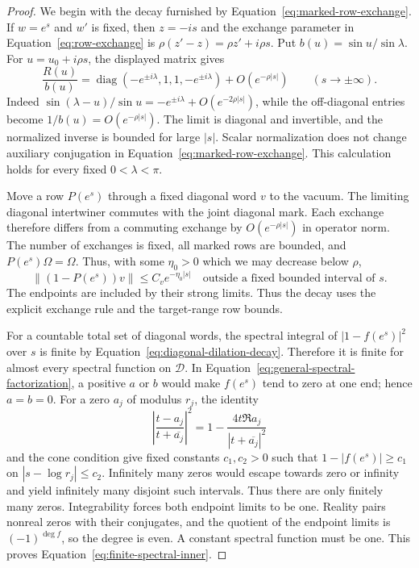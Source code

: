 \begin{proof}
We begin with the decay furnished by
Equation~\eqref{eq:marked-row-exchange}.  If $w=e^s$ and $w'$ is
fixed, then $z=-is$ and the exchange parameter in
Equation~\eqref{eq:row-exchange} is
$\rho(z'-z)=\rho z'+i\rho s$.  Put
$b(u)=\sin u/\sin\lambda$.  For $u=u_0+i\rho s$, the displayed
matrix gives
\begin{equation}\label{eq:normalized-intertwiner-limit}
 \frac{R(u)}{b(u)}
 =\operatorname{diag}(-e^{\pm i\lambda},1,1,-e^{\pm i\lambda})
       +O(e^{-\rho|s|})
 \qquad(s\longrightarrow\pm\infty).
\end{equation}
Indeed $\sin(\lambda-u)/\sin u=-e^{\pm i\lambda}
+O(e^{-2\rho|s|})$, while the off-diagonal entries become
$1/b(u)=O(e^{-\rho|s|})$.  The limit is diagonal and invertible,
and the normalized inverse is bounded for large $|s|$.  Scalar
normalization does not change auxiliary conjugation in
Equation~\eqref{eq:marked-row-exchange}.  This calculation holds
for every fixed $0<\lambda<\pi$.

Move a row $P(e^s)$ through a fixed diagonal word $v$ to the vacuum.
The limiting diagonal intertwiner commutes with the joint diagonal
mark.  Each exchange therefore differs from a commuting exchange by
$O(e^{-\rho|s|})$ in operator norm.  The number of exchanges is fixed,
all marked rows are bounded, and $P(e^s)\Omega=\Omega$.  Thus, with
some $\eta_0>0$ which we may decrease below $\rho$,
\begin{equation}\label{eq:diagonal-dilation-decay}
 \|(1-P(e^s))v\|\le C_v e^{-\eta_0|s|}
 \quad\text{outside a fixed bounded interval of }s.
\end{equation}
The endpoints are included by their strong limits.  Thus the decay
uses the explicit exchange rule and the target-range row bounds.

For a countable total set of diagonal words, the spectral integral of
$|1-f(e^s)|^2$ over $s$ is finite by
Equation~\eqref{eq:diagonal-dilation-decay}.  Therefore it is finite
for almost every spectral function on $\mathcal D$.  In
Equation~\eqref{eq:general-spectral-factorization}, a positive $a$
or $b$ would make $f(e^s)$ tend to zero at one end; hence $a=b=0$.
For a zero $a_j$ of modulus $r_j$, the identity
\[
 \left|\frac{t-a_j}{t+\overline{a_j}}\right|^2
 =1-\frac{4t\Re a_j}{|t+\overline{a_j}|^2}
\]
and the cone condition give fixed constants $c_1,c_2>0$ such that
$1-|f(e^s)|\ge c_1$ on $|s-\log r_j|\le c_2$.
Infinitely many zeros would escape towards zero or infinity and
yield infinitely many disjoint such intervals.  Thus there are only
finitely many zeros.  Integrability forces both endpoint limits to
be one.  Reality pairs nonreal zeros with their conjugates, and the
quotient of the endpoint limits is $(-1)^{\deg f}$, so the degree
is even.  A constant spectral function must be one.  This proves
Equation~\eqref{eq:finite-spectral-inner}.


\end{proof}
